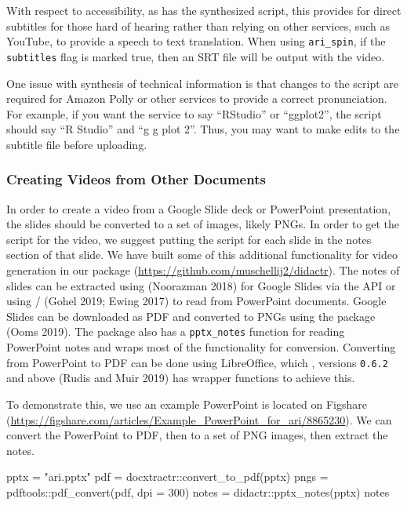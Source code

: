 With respect to accessibility, as  has the synthesized script,
this provides for direct subtitles for those hard of hearing rather than
relying on other services, such as YouTube, to provide a speech to text
translation. When using \texttt{ari\_spin}, if the \texttt{subtitles}
flag is marked true, then an SRT file will be output with the video.

One issue with synthesis of technical information is that changes to the
script are required for Amazon Polly or other services to provide a
correct pronunciation. For example, if you want the service to say
``RStudio'' or ``ggplot2'', the script should say ``R Studio'' and ``g g
plot 2''. Thus, you may want to make edits to the subtitle file before
uploading.

\hypertarget{creating-videos-from-other-documents}{%
\subsubsection{Creating Videos from Other
Documents}\label{creating-videos-from-other-documents}}

In order to create a video from a Google Slide deck or PowerPoint
presentation, the slides should be converted to a set of images, likely
PNGs. In order to get the script for the video, we suggest putting the
script for each slide in the notes section of that slide. We have built
some of this additional functionality for video generation in our
package  (\url{https://github.com/muschellij2/didactr}).
The notes of slides can be extracted using 
(Noorazman 2018) for Google Slides via the API or using
/ (Gohel 2019; Ewing 2017) to read
from PowerPoint documents. Google Slides can be downloaded as PDF and
converted to PNGs using the  package (Ooms 2019). The
 package also has a \texttt{pptx\_notes} function for
reading PowerPoint notes and wraps most of the functionality for
conversion. Converting from PowerPoint to PDF can be done using
LibreOffice, which , versions \texttt{0.6.2} and
above (Rudis and Muir 2019) has wrapper functions to achieve this.

To demonstrate this, we use an example PowerPoint is located on Figshare
(\url{https://figshare.com/articles/Example_PowerPoint_for_ari/8865230}).
We can convert the PowerPoint to PDF, then to a set of PNG images, then
extract the notes.

\begin{Schunk}
\begin{Sinput}
pptx = "ari.pptx"
pdf = docxtractr::convert_to_pdf(pptx)
pngs = pdftools::pdf_convert(pdf, dpi = 300)
notes = didactr::pptx_notes(pptx)
notes
\end{Sinput}
\end{Schunk}

